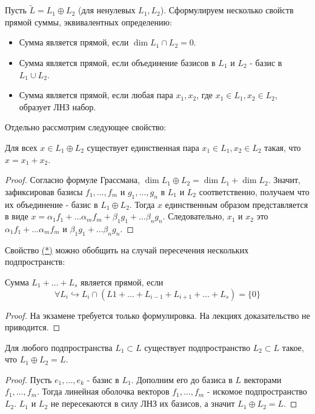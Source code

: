 Пусть $\tilde{L}=L_1 \oplus L_2$ (для ненулевых $L_1, L_2$). Сформулируем несколько свойств прямой суммы, эквивалентных определению:
\begin{itemize}
    \item Сумма является прямой, если $\dim L_1\cap L_2=0$.
    \item Сумма является прямой\label{property}, если объединение базисов в $L_1$ и $L_2$ - базис в $L_1 \cup L_2$.
    \item Сумма является прямой, если любая пара $x_1, x_2$, где $x_1\in L_1, x_2 \in L_2$, образует ЛНЗ набор.
\end{itemize}
Отдельно рассмотрим следующее свойство:
\begin{proposition}
    Для всех $x \in L_1 \oplus L_2$ существует единственная пара $x_1\in L_1, x_2 \in L_2$ такая, что $x=x_1+x_2$.
\end{proposition}
\begin{proof}
    Согласно формуле Грассмана, $\dim L_1 \oplus L_2= \dim L_1 + \dim L_2$. Значит, зафиксировав базисы $f_1, \dots, f_m$ и $g_1, \dots, g_n$ в $L_1$ и $L_2$ соответственно, получаем что их объединение - базис в $L_1 \oplus L_2$. Тогда $x$ единственным образом представляется в виде $x=\alpha_1 f_1 + \dots \alpha_m f_m + \beta_1 g_1 +\dots \beta_n g_n$. Следовательно, $x_1$ и $x_2$ это  $\alpha_1 f_1 + \dots \alpha_m f_m$ и $\beta_1 g_1 +\dots \beta_n g_n$.
\end{proof}

Свойство \hyperref[property]{(*)} можно обобщить на случай пересечения нескольких подпространств:
\begin{proposition}
    Сумма $L_1+\dots +L_s$ является прямой, если \[\forall L_i \hookrightarrow L_i \cap (L1+\dots+L_{i-1}+L_{i+1}+\dots +L_s)=\{0\}\]
\end{proposition}
\begin{proof}
    На экзамене требуется только формулировка. На лекциях доказательство не приводится.
\end{proof}
\begin{proposition}
    Для любого подпространства $L_1 \subset L$ существует подпространство $L_2 \subset L$ такое, что $L_1 \oplus L_2=L$.
\end{proposition}
\begin{proof}
    Пусть $e_1, \dots, e_k$ - базис в $L_1$. Дополним его до базиса в $L$ векторами $f_1, \dots, f_m$. Тогда линейная оболочка векторов $f_1, \dots, f_m$ - искомое подпространство $L_2$. $L_1$ и $L_2$ не пересекаются в силу ЛНЗ их базисов, а значит $L_1\oplus L_2=L$.
\end{proof}
